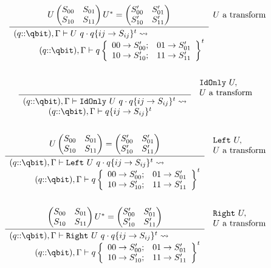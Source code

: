 \begin{figure}[htbp]
\[
\begin{gathered}
\infer[{\raisebox{7ex}{$U$ a transform}}]
   { \qresultsinUp{(q{::}\qbit),\Gamma\qentail
         \qop{U\ q}{\qsnodeij{q}{ij}{S_{ij}}{t}}} 
         {\quad(q{::}\qbit),\Gamma\qentail 
	\qsqbitUp{q}{S_{00}'}{S_{01}'}{S_{10}'}{S_{11}'}{t}}}
   { U\begin{pmatrix}S_{00}&S_{01}\\
  S_{10}&S_{11}\end{pmatrix} U^{*} = \begin{pmatrix}S_{00}'&S_{01}'\\
  S_{10}'&S_{11}'\end{pmatrix}}\\ 
\\
\infer[{\raisebox{6ex}{$\stacktwo{\IdOnly\ U,}{U \text{ a transform}}$}}]
   { \qresultsinUp{(q{::}\qbit),\Gamma\qentail
         \qop{\IdOnly\ U\ q}{\qsnodeij{q}{ij}{S_{ij}}{t}}} 
         {\quad(q{::}\qbit),\Gamma\qentail 
	{\qsnodeij{q}{ij}{S_{ij}}{t}}}}
    {} \\ 
\\
\infer[{\raisebox{8ex}{$\stacktwo{\Left\ U,}{U \text{ a transform}}$}}]
   { \qresultsinUp{(q{::}\qbit),\Gamma\qentail
         \qop{\Left\ U\ q}{\qsnodeij{q}{ij}{S_{ij}}{t}}} 
         {\quad(q{::}\qbit),\Gamma\qentail 
	\qsqbitUp{q}{S_{00}'}{S_{01}'}{S_{10}'}{S_{11}'}{t}}}
    { U\begin{pmatrix}S_{00}&S_{01}\\
  S_{10}&S_{11}\end{pmatrix} = \begin{pmatrix}S_{00}'&S_{01}'\\
  S_{10}'&S_{11}'\end{pmatrix}} \\ 
\\
\infer[{\raisebox{8ex}{$\stacktwo{\Right\ U,}{U \text{ a transform}}$}}]
   { \qresultsinUp{(q{::}\qbit),\Gamma\qentail
         \qop{\Right\ U\ q}{\qsnodeij{q}{ij}{S_{ij}}{t}}} 
         {\quad(q{::}\qbit),\Gamma\qentail 
	\qsqbitUp{q}{S_{00}'}{S_{01}'}{S_{10}'}{S_{11}'}{t}}}
    { \begin{pmatrix}S_{00}&S_{01}\\
  S_{10}&S_{11}\end{pmatrix}U^{*} = \begin{pmatrix}S_{00}'&S_{01}'\\
  S_{10}'&S_{11}'\end{pmatrix}}\\      

\end{gathered}\]
\end{figure}
